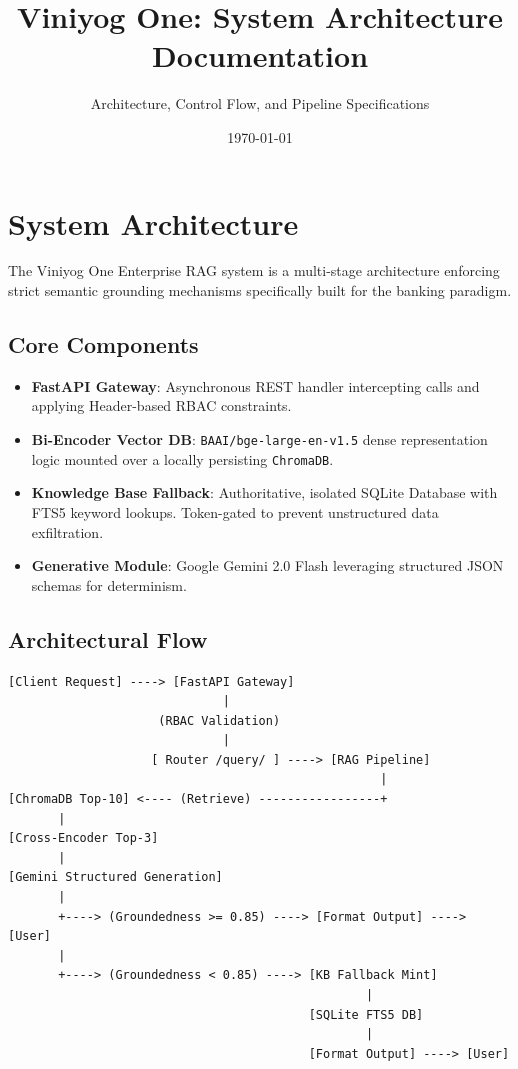 \documentclass[11pt,a4paper]{article}
\title{\textbf{Viniyog One: System Architecture Documentation}}
\author{Architecture, Control Flow, and Pipeline Specifications}
\date{\today}
\begin{document}
\maketitle

\section{System Architecture}

The Viniyog One Enterprise RAG system is a multi-stage architecture enforcing strict semantic grounding mechanisms specifically built for the banking paradigm. 

\subsection{Core Components}
\begin{itemize}
    \item \textbf{FastAPI Gateway}: Asynchronous REST handler intercepting calls and applying Header-based RBAC constraints.
    \item \textbf{Bi-Encoder Vector DB}: \texttt{BAAI/bge-large-en-v1.5} dense representation logic mounted over a locally persisting \texttt{ChromaDB}.
    \item \textbf{Knowledge Base Fallback}: Authoritative, isolated SQLite Database with FTS5 keyword lookups. Token-gated to prevent unstructured data exfiltration.
    \item \textbf{Generative Module}: Google Gemini 2.0 Flash leveraging structured JSON schemas for determinism.
\end{itemize}

\subsection{Architectural Flow}
\begin{verbatim}
[Client Request] ----> [FastAPI Gateway]
                              |
                     (RBAC Validation)
                              |
                    [ Router /query/ ] ----> [RAG Pipeline]
                                                    |
[ChromaDB Top-10] <---- (Retrieve) -----------------+
       |
[Cross-Encoder Top-3]
       |
[Gemini Structured Generation]
       |
       +----> (Groundedness >= 0.85) ----> [Format Output] ----> [User]
       |
       +----> (Groundedness < 0.85) ----> [KB Fallback Mint]
                                                  |
                                          [SQLite FTS5 DB]
                                                  |
                                          [Format Output] ----> [User]
\end{verbatim}
\end{document}

